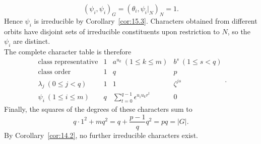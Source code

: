 \documentclass[../Odyssey_Project.tex]{subfiles}
\begin{document}
\begin{solution}
    \[
        (\psi_i,\psi_i)_G
        =
        (\theta_i,\psi_i|_N)_N
        =
        1.
    \]
    Hence $\psi_i$ is irreducible by Corollary~\ref{cor:15.3}. Characters obtained from different orbits have disjoint sets of irreducible constituents upon restriction to $N$, so the $\psi_i$ are distinct.\\
    The complete character table is therefore
    \[
        \begin{array}{c|c|c|c}
            \text{class representative}
            &1
            &a^{u_k}\ (1\leq k\leq m)
            &b^s\ (1\leq s<q)\\
            \text{class order}
            &1&q&p\\
            \hline
            \lambda_j\ (0\leq j<q)
            &1&1&\zeta^{js}\\
            \psi_i\ (1\leq i\leq m)
            &q&
            \displaystyle\sum_{t=0}^{q-1}\epsilon^{u_i u_k r^t}
            &0
        \end{array}.
    \]
    Finally, the squares of the degrees of these characters sum to
    \[
        q\cdot1^2+m q^2
        =
        q+\frac{p-1}{q}q^2
        =
        pq
        =
        |G|.
    \]
    By Corollary~\ref{cor:14.2}, no further irreducible characters exist.
\end{solution}
\end{document}
